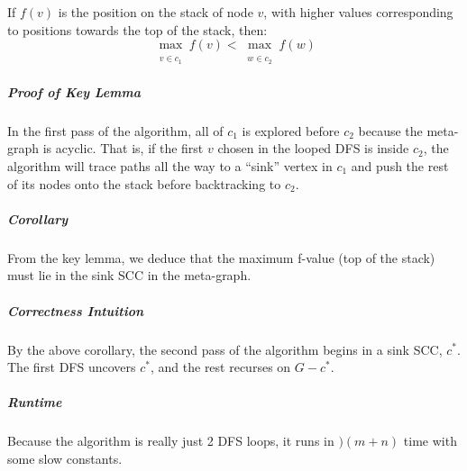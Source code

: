 \documentclass[11pt]{article}
\begin{document}
	If $f(v)$ is the position on the stack of node $v$, with higher values corresponding to positions towards the top of the stack, then:
	\begin{equation}
		\max_{\substack{ \\ v \in c_1}} f(v) < \max_{\substack{ \\ w \in c_2}} f(w)
	\end{equation}
	
	\subparagraph{Proof of Key Lemma} In the first pass of the algorithm, all of $c_1$ is explored before $c_2$ because the meta-graph is acyclic. That is, if the first $v$ chosen in the looped DFS is inside $c_2$, the algorithm will trace paths all the way to a ``sink'' vertex in $c_1$ and push the rest of its nodes onto the stack before backtracking to $c_2$.
	
	\subparagraph{Corollary} From the key lemma, we deduce that the maximum f-value (top of the stack) must lie in the sink SCC in the meta-graph.
	
	\begin{center}
	\end{center}
	
	\subparagraph{Correctness Intuition} By the above corollary, the second pass of the algorithm begins in a sink SCC, $c^*$. The first DFS uncovers $c^*$, and the rest recurses on $G-c^*$.
	
	\subparagraph{Runtime} Because the algorithm is really just 2 DFS loops, it runs in $)(m+n)$ time with some slow constants.

%		
%		


\end{document}
